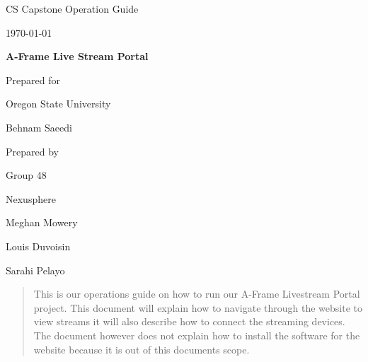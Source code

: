 \documentclass[onecolumn, draftclsnofoot,10pt, compsoc]{IEEEtran}
\def \CapstoneTeamName{		Nexusphere}
\def \CapstoneTeamNumber{		48}
\def \GroupMemberOne{			Meghan Mowery}
\def \GroupMemberTwo{			Louis Duvoisin}
\def \GroupMemberThree{			Sarahi Pelayo}
\def \CapstoneProjectName{		A-Frame Live Stream Portal}
\def \CapstoneSponsorCompany{	Oregon State University}
\def \CapstoneSponsorPerson{		Behnam Saeedi}
\def \DocType{		Operation Guide
				}
\begin{document}
\begin{titlepage}
    \begin{singlespace}
        \hfill 
        \par\vspace{.2in}
        \centering
        \scshape{
            \huge CS Capstone \DocType \par
            {\large\today}\par
            \vspace{.5in}
            \textbf{\Huge\CapstoneProjectName}\par
            \vfill
            {\large Prepared for}\par
            \Huge \CapstoneSponsorCompany\par
            \vspace{5pt}
            {\Large\CapstoneSponsorPerson\par}
            {\large Prepared by }\par
            Group\CapstoneTeamNumber\par
            \CapstoneTeamName\par 
            \vspace{5pt}
            {\Large
                \GroupMemberOne\par
                \GroupMemberTwo\par
                \GroupMemberThree\par
            }
            \vspace{20pt}
        }
        
        
        \begin{abstract}
        	This is our operations guide on how to run our A-Frame Livestream Portal project. This document will explain how to navigate through the website to view streams it will also describe how to connect the streaming devices. The document however does not explain how to install the software for the website because it is out of this documents scope.
         \end{abstract} 
     \end{singlespace}
\end{titlepage}   
\end{document}
